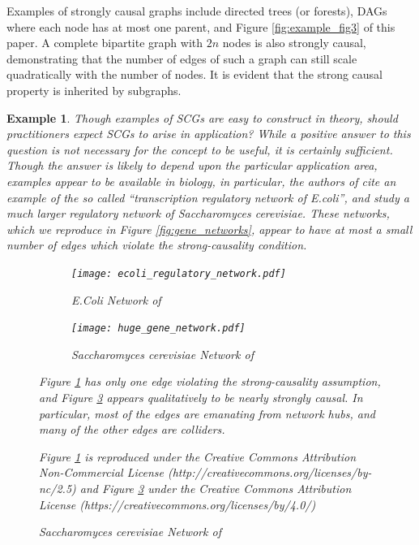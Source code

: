 \documentclass{statsoc}
\newtheorem{example}{Example}
\begin{document}
Examples of strongly causal graphs include directed trees (or
forests), DAGs where each node has at most one parent, and Figure
\ref{fig:example_fig3} of this paper.  A complete bipartite graph with
$2n$ nodes is also strongly causal, demonstrating that the number of
edges of such a graph can still scale quadratically with the number of
nodes.  It is evident that the strong causal property is inherited by
subgraphs.

\begin{example}
  Though examples of SCGs are easy to construct in theory, should
  practitioners expect SCGs to arise in application?  While a positive
  answer to this question is not \textit{necessary} for the concept to
  be useful, it is certainly sufficient.  Though the answer is likely
  to depend upon the particular application area, examples appear to
  be available in biology, in particular, the authors of
  \cite{discovering_graphical_Granger_causality_using_the_truncating_lasso_penalty}
  cite an example of the so called ``transcription regulatory network
  of \textit{E.coli}'', and
  \cite{learning_genome_scale_regulatory_networks} study a much larger
  regulatory network of \textit{Saccharomyces cerevisiae}.  These
  networks, which we reproduce in Figure \ref{fig:gene_networks},
  appear to have at most a small number of edges which violate the
  strong-causality condition.

  \begin{figure}[h]
    \centering
    \caption{Transcription Regulatory Networks}
    \label{fig:gene_networks}
    \begin{subfigure}[b]{0.45\textwidth}
      \caption{\textit{E.Coli} Network of
        \cite{discovering_graphical_Granger_causality_using_the_truncating_lasso_penalty}}
      \label{fig:gene_network1}
      \texttt{[image: ecoli\_regulatory\_network.pdf]}
    \end{subfigure}
    \begin{subfigure}[b]{0.45\textwidth}
      \caption{\textit{Saccharomyces cerevisiae} Network of
        \cite{learning_genome_scale_regulatory_networks}}
      \label{fig:gene_network2}
      \texttt{[image: huge\_gene\_network.pdf]}
    \end{subfigure}

    {\footnotesize Figure \ref{fig:gene_network1} has only one edge
      violating the strong-causality assumption, and Figure
      \ref{fig:gene_network2} appears qualitatively to be nearly
      strongly causal.  In particular, most of the edges are emanating
      from network hubs, and many of the other edges are colliders.

      Figure \ref{fig:gene_network1}
      is reproduced under the Creative Commons Attribution
      Non-Commercial License
      (http://creativecommons.org/licenses/by-nc/2.5) and Figure
      \ref{fig:gene_network2} under the Creative Commons Attribution
      License (https://creativecommons.org/licenses/by/4.0/)}
  \end{figure}
\end{example}
\end{document}
